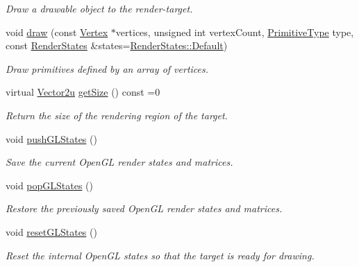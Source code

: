 \begin{DoxyCompactItemize}
\begin{DoxyCompactList}\small\item\em Draw a drawable object to the render-\/target. \end{DoxyCompactList}\item 
void \hyperlink{classsf_1_1RenderTarget_ab636d7363f6681077361ee274ba89a8d}{draw} (const \hyperlink{classsf_1_1Vertex}{Vertex} $\ast$vertices, unsigned int vertex\-Count, \hyperlink{group__graphics_ga5ee56ac1339984909610713096283b1b}{Primitive\-Type} type, const \hyperlink{classsf_1_1RenderStates}{Render\-States} \&states=\hyperlink{classsf_1_1RenderStates_ad29672df29f19ce50c3021d95f2bb062}{Render\-States\-::\-Default})
\begin{DoxyCompactList}\small\item\em Draw primitives defined by an array of vertices. \end{DoxyCompactList}\item 
virtual \hyperlink{classsf_1_1Vector2}{Vector2u} \hyperlink{classsf_1_1RenderTarget_a2e5ade2457d9fb4c4907ae5b3d9e94a5}{get\-Size} () const =0
\begin{DoxyCompactList}\small\item\em Return the size of the rendering region of the target. \end{DoxyCompactList}\item 
void \hyperlink{classsf_1_1RenderTarget_a8d1998464ccc54e789aaf990242b47f7}{push\-G\-L\-States} ()
\begin{DoxyCompactList}\small\item\em Save the current Open\-G\-L render states and matrices. \end{DoxyCompactList}\item 
void \hyperlink{classsf_1_1RenderTarget_ad5a98401113df931ddcd54c080f7aa8e}{pop\-G\-L\-States} ()
\begin{DoxyCompactList}\small\item\em Restore the previously saved Open\-G\-L render states and matrices. \end{DoxyCompactList}\item 
void \hyperlink{classsf_1_1RenderTarget_aac7504990d27dada4bfe3c7866920765}{reset\-G\-L\-States} ()
\begin{DoxyCompactList}\small\item\em Reset the internal Open\-G\-L states so that the target is ready for drawing. \end{DoxyCompactList}\end{DoxyCompactItemize}
